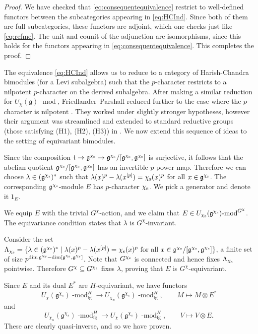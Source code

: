 \documentclass[twoside,12pt,reqno]{amsart}
\theoremstyle{remark}
\numberwithin{equation}{section}
\def\rs{{\mathrm s}}
\def\lmod{\!\operatorname{-mod}}
\def\g{{\mathfrak g}}
\def\t{\mathfrak t}
\newcommand{\fg}{\operatorname{fg}}
\renewcommand{\rs}{{\rm s}}
\begin{document}
\begin{proof}
    We have checked that \eqref{eq:consequentequivalence} restrict to well-defined functors between the subcategories appearing in \eqref{eq:HCInd}.
    Since both of them are full subcategories, these functors are adjoint, which one checks just like \eqref{eq:refme}. The unit and counit of the adjunction are isomorphisms, since this holds for the functors appearing in \eqref{eq:consequentequivalence}. This completes the proof.
\end{proof}

The equivalence \eqref{eq:HCInd} allows us to reduce to a category of Harish-Chandra bimodules (for a Levi subalgebra) such that the $p$-character restricts to a nilpotent $p$-character on the derived subalgebra. After making a similar reduction for $U_\chi(\g)\lmod$, Friedlander--Parshall reduced further to the case where the $p$-character is nilpotent \cite[Corollary~3.3]{FP}. They worked under slightly stronger hypotheses, however their argument was streamlined and extended to standard reductive groups (those satisfying (H1), (H2), (H3)) in \cite[B.9]{JaLATokyo}. We now extend this sequence of ideas to the setting of equivariant bimodules.

Since the composition $\t \to \g^{\chi_\rs} \to \g^{\chi_\rs}/ [\g^{\chi_\rs}, \g^{\chi_\rs}]$ is surjective, it follows that the abelian quotient $\g^{\chi_\rs}/ [\g^{\chi_\rs}, \g^{\chi_\rs}]$ has an invertible $p$-power map. Therefore we can choose $\lambda \in (\g^{\chi_\rs})^*$ such that $\lambda(x)^p - \lambda(x^{[p]}) = \chi_\rs(x)^p$ for all $x\in \g^{\chi_\rs}$. The corresponding $\g^{\chi_\rs}$-module $E$ has $p$-character $\chi_\rs$. We pick a generator and denote it $1_E$.

We equip $E$ with the trivial $G^\chi$-action, and we claim that $E \in U_{\chi_\rs}(\g^{\chi_\rs})\lmod^{G^\chi}$. The equivariance condition states that $\lambda$ is $G^\chi$-invariant.

Consider the set $\Lambda_{\chi_\rs} = \{ \lambda \in (\g^{\chi_\rs})^\ast \mid \lambda(x)^p - \lambda(x^{[p]}) = \chi_\rs(x)^p \text{ for all } x \in \g^{\chi_\rs} / [\g^{\chi_\rs},\g^{\chi_\rs}] \}$, a finite set of size $p^{\dim \g^{\chi_\rs} - \dim [\g^{\chi_\rs},\g^{\chi_\rs}]}$. Note that $G^{\chi_\rs}$ is connected and hence fixes $\Lambda_{\chi_\rs}$ pointwise. Therefore $G^\chi \subseteq G^{\chi_\rs}$ fixes $\lambda$, proving that $E$ is $G^\chi$-equivariant.

Since $E$ and its dual $E^*$ are $H$-equivariant, we have functors
\begin{equation} \label{eq: FP equivalence 3}
    U_\chi(\g^{\chi_s})\lmod^H_{\fg} \to U_{\chi_n}(\g^{\chi_s})\lmod^H_{\fg}, \qquad M \mapsto M \otimes E^*
\end{equation}
and
\begin{equation} \label{eq: FP equivalence 4}
    U_{\chi_n}(\g^{\chi_s})\lmod^H_{\fg} \to U_\chi(\g^{\chi_s})\lmod^H_{\fg}, \qquad V \mapsto V \otimes E.
\end{equation}
These are clearly quasi-inverse, and so we have proven.
\end{document}
